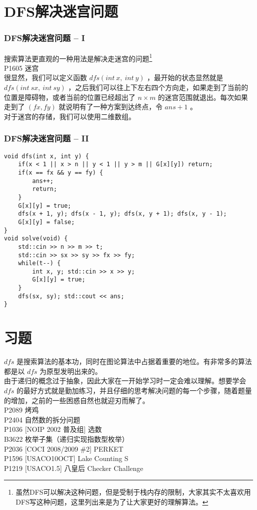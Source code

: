 \documentclass{beamer}
\begin{document}
\section{DFS解决迷宫问题}
\begin{frame}
\frametitle{DFS解决迷宫问题 -- I}
搜索算法更直观的一种用法是解决走迷宫的问题\footnote{虽然DFS可以解决这种问题，但是受制于栈内存的限制，大家其实不太喜欢用DFS写这种问题，这里列出来是为了让大家更好的理解算法。}\\
P1605 迷宫\\ 
很显然，我们可以定义函数 $dfs(int \ x, \ int \ y)$ ，最开始的状态显然就是 $dfs(int \ sx, \ int \ sy)$ ，之后我们可以往上下左右四个方向走，如果走到了当前的位置是障碍物，或者当前的位置已经超出了 $n \times m$ 的迷宫范围就退出。每次如果走到了 $(fx, fy)$ 就说明有了一种方案到达终点，令 $ans + 1$ 。\\ 
对于迷宫的存储，我们可以使用二维数组。
\end{frame}
\begin{frame}[fragile]
\frametitle{DFS解决迷宫问题 -- II}
\begin{onlyenv}
\begin{verbatim}
void dfs(int x, int y) {
    if(x < 1 || x > n || y < 1 || y > m || G[x][y]) return;
    if(x == fx && y == fy) {
        ans++;
        return;
    }
    G[x][y] = true;
    dfs(x + 1, y); dfs(x - 1, y); dfs(x, y + 1); dfs(x, y - 1);
    G[x][y] = false;
}
void solve(void) {
    std::cin >> n >> m >> t;
    std::cin >> sx >> sy >> fx >> fy;
    while(t--) {
        int x, y; std::cin >> x >> y;
        G[x][y] = true;
    }
    dfs(sx, sy); std::cout << ans;
}
\end{verbatim}
\end{onlyenv}
\end{frame}
\section{习题}
\begin{frame}
$dfs$ 是搜索算法的基本功，同时在图论算法中占据着重要的地位。有非常多的算法都是以 $dfs$ 为原型发明出来的。\\
由于递归的概念过于抽象，因此大家在一开始学习时一定会难以理解。想要学会 $dfs$ 的最好方式就是勤加练习，并且仔细的思考解决问题的每一个步骤，随着题量的增加，之前的一些困惑自然也就迎刃而解了。\\
P2089 烤鸡 \\ 
P2404 自然数的拆分问题\\
P1036 [NOIP 2002 普及组] 选数\\
B3622 枚举子集（递归实现指数型枚举）\\
P2036 [COCI 2008/2009 \#2] PERKET\\ 
P1596 [USACO10OCT] Lake Counting S \\ 
P1219	[USACO1.5] 八皇后 Checker Challenge
\end{frame}
\end{document}
